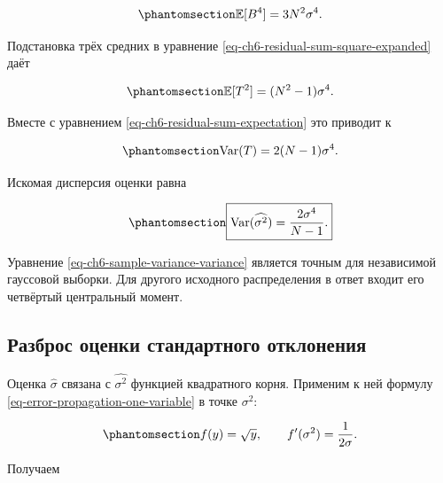 \documentclass[
  russian,
  11pt,
  a4paper,
  open=any]{scrbook}
\begin{document}
\begin{bookderivation}
\begin{equation}\protect\phantomsection\label{eq-ch6-b-fourth-moment}{
\mathbb E[B^4]=3N^2\sigma^4.
}\end{equation}

Подстановка трёх средних в уравнение
\ref{eq-ch6-residual-sum-square-expanded} даёт

\begin{equation}\protect\phantomsection\label{eq-ch6-residual-sum-second-moment}{
\mathbb E[T^2]=(N^2-1)\sigma^4.
}\end{equation}

Вместе с уравнением \ref{eq-ch6-residual-sum-expectation} это приводит к

\begin{equation}\protect\phantomsection\label{eq-ch6-residual-sum-variance}{
\operatorname{Var}(T)
=2(N-1)\sigma^4.
}\end{equation}

Искомая дисперсия оценки равна

\begin{equation}\protect\phantomsection\label{eq-ch6-sample-variance-variance}{
\boxed{
\operatorname{Var}(\widehat{\sigma^2})
=\frac{2\sigma^4}{N-1}.
}
}\end{equation}

\end{bookderivation}

Уравнение \ref{eq-ch6-sample-variance-variance} является точным для
независимой гауссовой выборки. Для другого исходного распределения в
ответ входит его четвёртый центральный момент.

\subsection{Разброс оценки стандартного
отклонения}\label{ux440ux430ux437ux431ux440ux43eux441-ux43eux446ux435ux43dux43aux438-ux441ux442ux430ux43dux434ux430ux440ux442ux43dux43eux433ux43e-ux43eux442ux43aux43bux43eux43dux435ux43dux438ux44f-1}

Оценка \(\widehat\sigma\) связана с \(\widehat{\sigma^2}\) функцией
квадратного корня. Применим к ней формулу
\ref{eq-error-propagation-one-variable} в точке \(\sigma^2\):

\begin{equation}\protect\phantomsection\label{eq-ch6-square-root-derivative}{
f(y)=\sqrt y,
\qquad
f'(\sigma^2)=\frac1{2\sigma}.
}\end{equation}

Получаем
\end{document}
